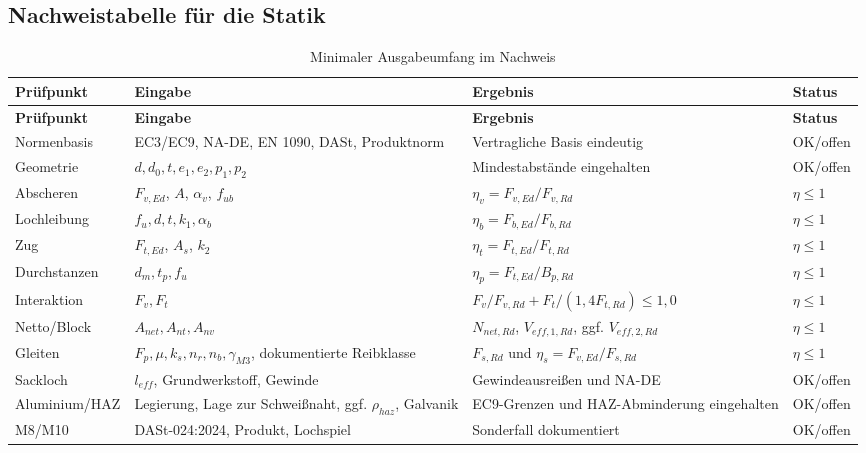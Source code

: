 \documentclass[10pt,a4paper]{article}
\begin{document}
\subsection{Nachweistabelle für die Statik}
\begin{longtable}{@{}p{38mm}p{45mm}p{45mm}p{28mm}@{}}
\caption{Minimaler Ausgabeumfang im Nachweis}\\
\toprule
\textbf{Prüfpunkt} & \textbf{Eingabe} & \textbf{Ergebnis} & \textbf{Status} \\
\midrule
\endfirsthead
\toprule
\textbf{Prüfpunkt} & \textbf{Eingabe} & \textbf{Ergebnis} & \textbf{Status} \\
\midrule
\endhead
Normenbasis & EC3/EC9, NA-DE, EN 1090, DASt, Produktnorm & Vertragliche Basis eindeutig & OK/offen \\
Geometrie & $d,d_0,t,e_1,e_2,p_1,p_2$ & Mindestabstände eingehalten & OK/offen \\
Abscheren & $F_{v,Ed}$, $A$, $\alpha_v$, $f_{ub}$ & $\eta_v=F_{v,Ed}/F_{v,Rd}$ & $\eta\leq1$ \\
Lochleibung & $f_u,d,t,k_1,\alpha_b$ & $\eta_b=F_{b,Ed}/F_{b,Rd}$ & $\eta\leq1$ \\
Zug & $F_{t,Ed}$, $A_s$, $k_2$ & $\eta_t=F_{t,Ed}/F_{t,Rd}$ & $\eta\leq1$ \\
Durchstanzen & $d_m,t_p,f_u$ & $\eta_p=F_{t,Ed}/B_{p,Rd}$ & $\eta\leq1$ \\
Interaktion & $F_v,F_t$ & $F_v/F_{v,Rd}+F_t/(1{,}4F_{t,Rd})\leq1{,}0$ & $\eta\leq1$ \\
Netto/Block & $A_{net},A_{nt},A_{nv}$ & $N_{net,Rd}$, $V_{eff,1,Rd}$, ggf. $V_{eff,2,Rd}$ & $\eta\leq1$ \\
Gleiten & $F_p,\mu,k_s,n_r,n_b,\gamma_{M3}$, dokumentierte Reibklasse & $F_{s,Rd}$ und $\eta_s=F_{v,Ed}/F_{s,Rd}$ & $\eta\leq1$ \\
Sackloch & $l_{eff}$, Grundwerkstoff, Gewinde & Gewindeausreißen und NA-DE & OK/offen \\
Aluminium/HAZ & Legierung, Lage zur Schweißnaht, ggf. $\rho_{haz}$, Galvanik & EC9-Grenzen und HAZ-Abminderung eingehalten & OK/offen \\
M8/M10 & DASt-024:2024, Produkt, Lochspiel & Sonderfall dokumentiert & OK/offen \\
\bottomrule
\end{longtable}
\end{document}
